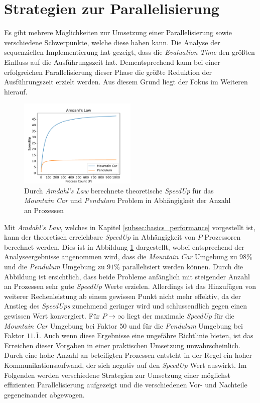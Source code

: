 \section{Strategien zur Parallelisierung}
\label{sec:parallel_strategies}
Es gibt mehrere Möglichkeiten zur Umsetzung einer Parallelisierung sowie verschiedene Schwerpunkte, welche diese haben kann. Die Analyse der sequenziellen Implementierung hat gezeigt, dass die \emph{Evaluation Time} den größten Einfluss auf die Ausführungszeit hat.  Dementsprechend kann bei einer erfolgreichen Parallelisierung dieser Phase die größte Reduktion der Ausführungszeit erzielt werden. Aus diesem Grund liegt der Fokus im Weiteren hierauf. 
\begin{figure}[!h]
	\centering
	\includegraphics[width=0.5\textwidth]{./img/ahmdals_law_mountain_pendulum.pdf} 
	\caption{Durch \emph{Amdahl's Law} berechnete theoretische \emph{SpeedUp} für das \emph{Mountain Car} und \emph{Pendulum} Problem in Abhängigkeit der Anzahl an Prozessen}
	\label{fig:amdahls_law_mountain_pendulum}
\end{figure}
Mit \emph{Amdahl's Law}, welches in Kapitel \ref{subsec:basics_performance} vorgestellt ist, kann der theoretisch erreichbare \emph{SpeedUp} in Abhängigkeit von $P$ Prozessoren berechnet werden. Dies ist in Abbildung \ref{fig:amdahls_law_mountain_pendulum} dargestellt, wobei entsprechend der Analyseergebnisse angenommen wird, dass die \emph{Mountain Car} Umgebung zu $98\%$ und die \emph{Pendulum} Umgebung zu $91\%$ parallelisiert werden können. Durch die Abbildung ist ersichtlich, dass beide Probleme anfänglich mit steigender Anzahl an Prozessen sehr gute \emph{SpeedUp} Werte erzielen. Allerdings ist das Hinzufügen von weiterer Rechenleistung ab einem gewissen Punkt nicht mehr effektiv, da der Anstieg des \emph{SpeedUps} zunehmend geringer wird und schlussendlich gegen einen gewissen Wert konvergiert. Für $P \rightarrow \infty$ liegt der maximale \emph{SpeedUp} für die \emph{Mountain Car} Umgebung bei Faktor 50 und für die \emph{Pendulum} Umgebung bei Faktor $11.\overline{1}$. Auch wenn diese Ergebnisse eine ungefähre Richtlinie bieten, ist das Erreichen dieser Vorgaben in einer praktischen Umsetzung unwahrscheinlich. Durch eine hohe Anzahl an beteiligten Prozessen entsteht in der Regel ein hoher Kommunikationsaufwand, der sich negativ auf den \emph{SpeedUp} Wert auswirkt. Im Folgenden werden verschiedene Strategien zur Umsetzung einer möglichst effizienten Parallelisierung aufgezeigt und die verschiedenen Vor- und Nachteile gegeneinander abgewogen.
